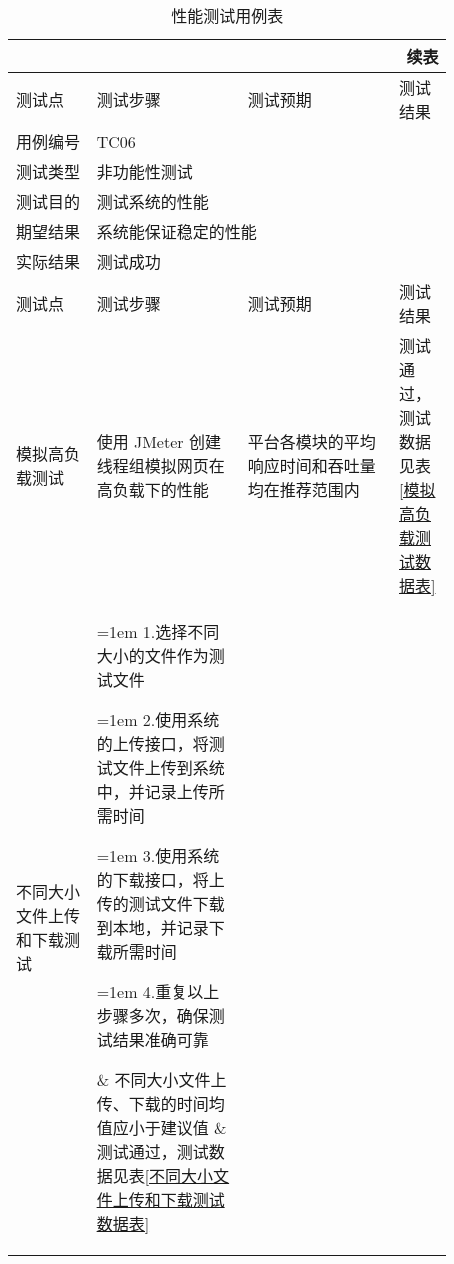 \begin{longtable}{|m{0.16\linewidth}|m{0.3\linewidth}|m{0.3\linewidth}|m{0.11\linewidth}|}

    \caption{性能测试用例表}\label{tab:性能测试用例表} \\
     \endfirsthead
     \multicolumn{4}{r}{ \bf{续表} }  \\
     \hline
     测试点   & 测试步骤                          & 测试预期             & 测试结果 \\
     \hline
     \endhead
     \hline
     用例编号  & \multicolumn{3}{l|}{TC06} \\
     \hline
     测试类型  & \multicolumn{3}{l|}{非功能性测试}                                 \\
     \hline
     测试目的  & \multicolumn{3}{l|}{测试系统的性能}                          \\
     \hline
     期望结果  & \multicolumn{3}{l|}{系统能保证稳定的性能}                           \\
     \hline
     实际结果  & \multicolumn{3}{l|}{测试成功}                                 \\
     \hline
     测试点   & 测试步骤                          & 测试预期             & 测试结果 \\
     \hline
     模拟高负载测试 & 使用 JMeter 创建线程组模拟网页在高负载下的性能
                    & 平台各模块的平均响应时间和吞吐量均在推荐范围内   & 测试通过，测试数据见表\ref{模拟高负载测试数据表} \\
     \hline
     不同大小文件上传和下载测试 & \parbox[t]{4.5cm}{\hangindent=1em 1.选择不同大小的文件作为测试文件} \vspace{-0.8mm}
                    \newline \parbox[t]{4.5cm}{\hangindent=1em 2.使用系统的上传接口，将测试文件上传到系统中，并记录上传所需时间} \vspace{-0.8mm}
                    \newline \parbox[t]{4.5cm}{\hangindent=1em 3.使用系统的下载接口，将上传的测试文件下载到本地，并记录下载所需时间} \vspace{-0.8mm}
                    \newline \parbox[t]{4.5cm}{\hangindent=1em 4.重复以上步骤多次，确保测试结果准确可靠} \vspace{-0.8mm}
                    & 不同大小文件上传、下载的时间均值应小于建议值   & 测试通过，测试数据见表\ref{不同大小文件上传和下载测试数据表} \\
     \hline
\end{longtable}

